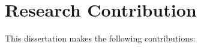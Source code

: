 %
%
%
%
%
%
%
%
%

\section*{Research Contribution}

This dissertation makes the following contributions:


